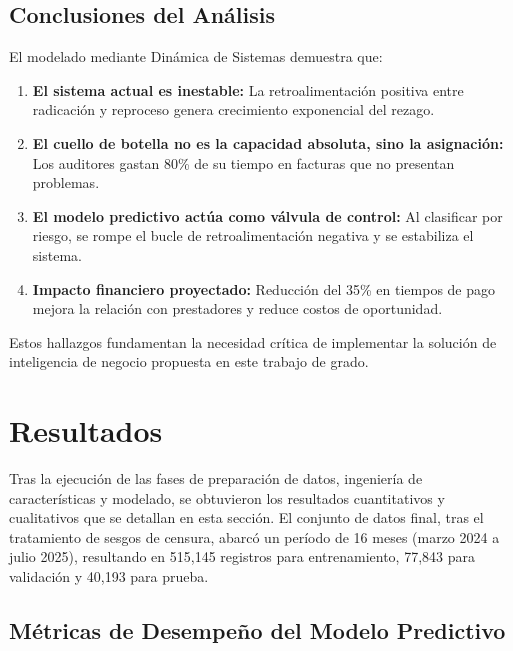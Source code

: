\documentclass[12pt,letterpaper]{report}
\begin{document}
\section{Conclusiones del Análisis}

El modelado mediante Dinámica de Sistemas demuestra que:

\begin{enumerate}
    \item \textbf{El sistema actual es inestable:} La retroalimentación positiva entre radicación y reproceso genera crecimiento exponencial del rezago.
    
    \item \textbf{El cuello de botella no es la capacidad absoluta, sino la asignación:} Los auditores gastan 80\% de su tiempo en facturas que no presentan problemas.
    
    \item \textbf{El modelo predictivo actúa como válvula de control:} Al clasificar por riesgo, se rompe el bucle de retroalimentación negativa y se estabiliza el sistema.
    
    \item \textbf{Impacto financiero proyectado:} Reducción del 35\% en tiempos de pago mejora la relación con prestadores y reduce costos de oportunidad.
\end{enumerate}

Estos hallazgos fundamentan la necesidad crítica de implementar la solución de inteligencia de negocio propuesta en este trabajo de grado.

\clearpage
\chapter{Resultados}

Tras la ejecución de las fases de preparación de datos, ingeniería de características y modelado, se obtuvieron los resultados cuantitativos y cualitativos que se detallan en esta sección. El conjunto de datos final, tras el tratamiento de sesgos de censura, abarcó un período de 16 meses (marzo 2024 a julio 2025), resultando en 515,145 registros para entrenamiento, 77,843 para validación y 40,193 para prueba.

\section{Métricas de Desempeño del Modelo Predictivo}
\end{document}

